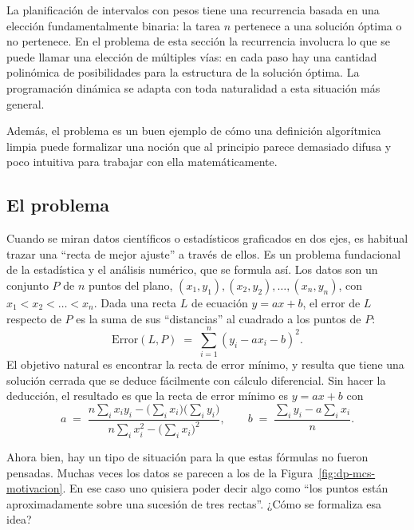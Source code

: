 \documentclass[12pt, spanish, oneside, openany]{book}
\theoremstyle{uprightplain}
\theoremstyle{definition}
\theoremstyle{remark}
\theoremstyle{definition}
\begin{document}
La planificación de intervalos con pesos tiene una recurrencia basada en una elección fundamentalmente binaria: la tarea $n$ pertenece a una solución óptima o no pertenece. En el problema de esta sección la recurrencia involucra lo que se puede llamar una elección de múltiples vías: en cada paso hay una cantidad polinómica de posibilidades para la estructura de la solución óptima. La programación dinámica se adapta con toda naturalidad a esta situación más general.

Además, el problema es un buen ejemplo de cómo una definición algorítmica limpia puede formalizar una noción que al principio parece demasiado difusa y poco intuitiva para trabajar con ella matemáticamente.

\subsection{El problema}

Cuando se miran datos científicos o estadísticos graficados en dos ejes, es habitual trazar una ``recta de mejor ajuste'' a través de ellos. Es un problema fundacional de la estadística y el análisis numérico, que se formula así. Los datos son un conjunto $P$ de $n$ puntos del plano, $(x_1,y_1),(x_2,y_2),\dots,(x_n,y_n)$, con $x_1<x_2<\dots<x_n$. Dada una recta $L$ de ecuación $y=ax+b$, el error de $L$ respecto de $P$ es la suma de sus ``distancias'' al cuadrado a los puntos de $P$:
\[
\mathrm{Error}(L,P) \;=\; \sum_{i=1}^{n} (y_i-ax_i-b)^2 .
\]
El objetivo natural es encontrar la recta de error mínimo, y resulta que tiene una solución cerrada que se deduce fácilmente con cálculo diferencial. Sin hacer la deducción, el resultado es que la recta de error mínimo es $y=ax+b$ con
\begin{equation}
\label{eq:dp-minimos-cuadrados}
a \;=\; \frac{n\sum_i x_iy_i-\bigl(\sum_i x_i\bigr)\bigl(\sum_i y_i\bigr)}{n\sum_i x_i^2-\bigl(\sum_i x_i\bigr)^2},
\qquad
b \;=\; \frac{\sum_i y_i - a\sum_i x_i}{n} .
\end{equation}

Ahora bien, hay un tipo de situación para la que estas fórmulas no fueron pensadas. Muchas veces los datos se parecen a los de la Figura~\ref{fig:dp-mcs-motivacion}. En ese caso uno quisiera poder decir algo como ``los puntos están aproximadamente sobre una sucesión de tres rectas''. ¿Cómo se formaliza esa idea?
\end{document}
